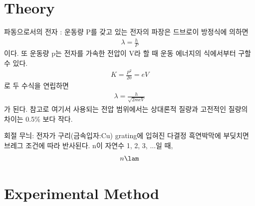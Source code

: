 \documentclass[a4paper, 10pt, nanum]{CSUniSchoolLabReport}
\begin{document}

\section{Theory}


	파동으로서의 전자 : 운동량 P를 갖고 있는 전자의 파장은 드브로이 방정식에 의하면
	\begin{align}
		\lambda = \frac{h}{P}
	\end{align}
	이다. 또 운동량 p는 전자를 가속한 전압이 V라 할 때 운동 에너지의 식에서부터 구할 수 있다.
	\begin{align}
		K = \frac{P^2}{20} = eV
	\end{align}
	로 두 수식을 연립하면
	\begin{align}
		\lambda = \frac{h}{\sqrt{2meV}}
	\end{align}
	가 된다. 참고로 여기서 사용되는 전압 범위에서는 상대론적 질량과 고전적인 질량의 차이는 0.5\% 보다 작다.

	회절 무늬: 전자가 구리(금속입자:Cu) grating에 입혀진 다결정 흑연박막에 부딪치면 브레그 조건에 따라 반사된다. n이 자연수 1, 2, 3, ...일 때,
	\begin{align}
		n\lam
	\end{align}



\section{Experimental Method}
\end{document}

